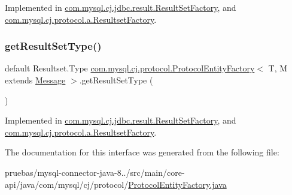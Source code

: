 Implemented in \mbox{\hyperlink{classcom_1_1mysql_1_1cj_1_1jdbc_1_1result_1_1_result_set_factory_aec51b1445e56580f9cdaba1427d8b861}{com.\+mysql.\+cj.\+jdbc.\+result.\+Result\+Set\+Factory}}, and \mbox{\hyperlink{classcom_1_1mysql_1_1cj_1_1protocol_1_1a_1_1_resultset_factory_add802e01666fd1a41db44894232f912d}{com.\+mysql.\+cj.\+protocol.\+a.\+Resultset\+Factory}}.

\mbox{\label{interfacecom_1_1mysql_1_1cj_1_1protocol_1_1_protocol_entity_factory_a288de4370d4af19186625e7404b4cca5}} 
\subsubsection{\texorpdfstring{get\+Result\+Set\+Type()}{getResultSetType()}}
{\footnotesize\ttfamily default Resultset.\+Type \mbox{\hyperlink{interfacecom_1_1mysql_1_1cj_1_1protocol_1_1_protocol_entity_factory}{com.\+mysql.\+cj.\+protocol.\+Protocol\+Entity\+Factory}}$<$ T, M extends \mbox{\hyperlink{interfacecom_1_1mysql_1_1cj_1_1protocol_1_1_message}{Message}} $>$.get\+Result\+Set\+Type (\begin{DoxyParamCaption}{ }\end{DoxyParamCaption})}



Implemented in \mbox{\hyperlink{classcom_1_1mysql_1_1cj_1_1jdbc_1_1result_1_1_result_set_factory_a09f8de6edd7696e5095a1b04ae26c573}{com.\+mysql.\+cj.\+jdbc.\+result.\+Result\+Set\+Factory}}, and \mbox{\hyperlink{classcom_1_1mysql_1_1cj_1_1protocol_1_1a_1_1_resultset_factory_a22c757bc4f5d57428ad2d34ee330cd66}{com.\+mysql.\+cj.\+protocol.\+a.\+Resultset\+Factory}}.



The documentation for this interface was generated from the following file\+:\begin{DoxyCompactItemize}
\item 
pruebas/mysql-\/connector-\/java-\/8../src/main/core-\/api/java/com/mysql/cj/protocol/\mbox{\hyperlink{_protocol_entity_factory_8java}{Protocol\+Entity\+Factory.\+java}}\end{DoxyCompactItemize}
